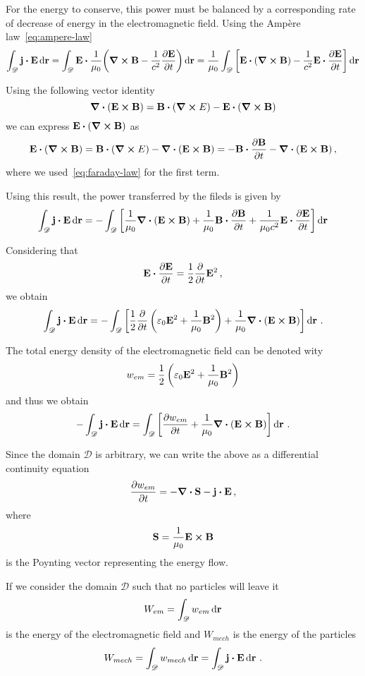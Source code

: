 \documentclass[12pt, class=report, crop=false]{standalone}
\begin{document}
For the energy to conserve, this power must be balanced by a corresponding
rate of decrease of energy in the electromagnetic field.
Using the Ampère law~\eqref{eq:ampere-law}
\[
  \int_{\mathscr{D}} \vb{j} \vdot \vb{E} \dd{\vb{r}} =
  \int_{\mathscr{D}} \vb{E} \vdot \frac{1}{\mu_0} \qty(\curl{\vb{B}} - \frac{1}{c^2} \pdv{\vb{E}}{t}) \dd{\vb{r}} =
  \frac{1}{\mu_0} \int_{\mathscr{D}} \left[\vb{E} \vdot(\curl{\vb{B}}) -
    \frac{1}{c^2} \vb{E} \vdot \pdv{\vb{E}}{t} \right] \dd{\vb{r}}
\]

Using the following vector identity
\[
  \div(\vb{E} \cp \vb{B}) = \vb{B} \vdot (\curl{E}) - \vb{E} \vdot (\curl{\vb{B}})
\]
we can express \(\vb{E} \vdot(\curl{\vb{B}})\) as
\[
  \vb{E} \vdot(\curl{\vb{B}}) = \vb{B} \vdot (\curl{E}) - \div(\vb{E} \cp \vb{B}) =
  - \vb{B} \vdot \pdv{\vb{B}}{t} - \div(\vb{E} \cp \vb{B})\,,
\]
where we used~\eqref{eq:faraday-law} for the first term.

Using this result, the power transferred by the fileds is given by
\[
  \int_{\mathscr{D}} \vb{j} \vdot \vb{E} \dd{\vb{r}} =
  -\int_{\mathscr{D}} \left[\frac{1}{\mu_0} \div(\vb{E} \cp \vb{B}) + \frac{1}{\mu_0} \vb{B} \vdot \pdv{\vb{B}}{t} +
    \frac{1}{\mu_0 c^2} \vb{E} \vdot \pdv{\vb{E}}{t} \right] \dd{\vb{r}}
\]

Considering that
\[
  \vb{E} \vdot \pdv{\vb{E}}{t} = \frac{1}{2} \pdv{t} \vb{E}^2\,,
\]
we obtain
\[
  \int_{\mathscr{D}} \vb{j} \vdot \vb{E} \dd{\vb{r}} =
  -\int_{\mathscr{D}} \left[ \frac{1}{2} \pdv{t}
    \left( \varepsilon_0 \vb{E}^2 + \frac{1}{\mu_0}\vb{B}^2 \right)
  + \frac{1}{\mu_0}\div(\vb{E} \cp \vb{B}) \right] \dd{\vb{r}}\,.
\]

The total energy density of the electromagnetic field can be denoted wity
\[
  w_{em} = \frac{1}{2} \left( \varepsilon_0 \vb{E}^2 + \frac{1}{\mu_0}\vb{B}^2 \right)
\]
and thus we obtain
\[
  -\int_{\mathscr{D}} \vb{j} \vdot \vb{E} \dd{\vb{r}} =
  \int_{\mathscr{D}} \left[ \pdv{w_{em}}{t} +
  \frac{1}{\mu_0}\div(\vb{E} \cp \vb{B}) \right] \dd{\vb{r}}\,.
\]

Since the domain \(\mathscr{D}\) is arbitrary, we can write the above as a
differential continuity equation
\begin{equation}
  \label{eq:poynting-theorem-local}
  \pdv{w_{em}}{t} = - \div{\vb{S}} - \vb{j} \vdot \vb{E}\,,
\end{equation}
where
\[
  \vb{S} = \frac{1}{\mu_0} \vb{E} \cp \vb{B}
\]
is the Poynting vector representing the energy flow.

If we consider the domain \(\mathscr{D}\) such that no particles will leave it
\[
  W_{em} = \int_{\mathscr{D}} w_{em} \dd{\vb{r}}
\]
is the energy of the electromagnetic field and \(W_{mech}\) is the
energy of the particles
\[
  W_{mech} = \int_{\mathscr{D}} w_{mech} \dd{\vb{r}} =
  \int_{\mathscr{D}} \vb{j} \vdot \vb{E} \dd{\vb{r}}\,.
\]
\end{document}
